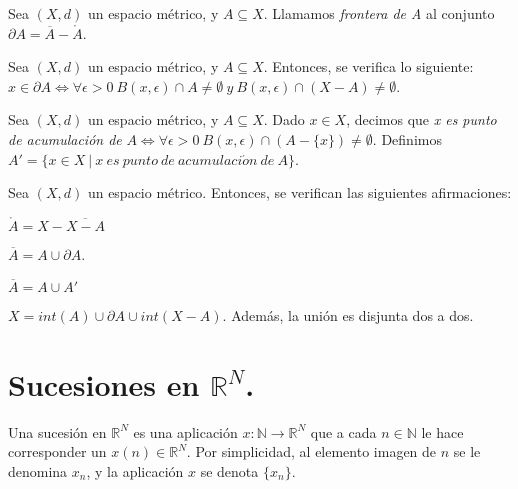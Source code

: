 \begin{ndef}[Frontera]
Sea $(X,d)$ un espacio métrico, y $A\subseteq X$. Llamamos \textit{frontera de A} al conjunto $\partial A = \overline{A}-\mathring{A}$.
\end{ndef}



\begin{nprop}
Sea $(X,d)$ un espacio métrico, y $A\subseteq X$. Entonces, se verifica lo siguiente:
$x\in \partial A \iff \forall \epsilon > 0\ B(x,\epsilon)\cap A \neq \emptyset \ y\ B(x,\epsilon)\cap (X-A) \neq \emptyset$.
\end{nprop}



\begin{ndef}
Sea $(X,d)$ un espacio métrico, y $A\subseteq X$. Dado $x\in X$, decimos que \textit{x es punto de acumulación de} $A \iff \forall \epsilon > 0\ B(x,\epsilon)\cap (A-\{x\})\neq \emptyset$. Definimos $A' = \{ x\in X \ | \ x\ es\ punto\ de\ acumulaci\acute{o}n\ de\ A \}$.
\end{ndef}



\begin{nprop}
Sea $(X,d)$ un espacio métrico. Entonces, se verifican las siguientes afirmaciones:

\begin{nlist}
\item $\mathring{A} = X - \overline{X-A}$

\item $\overline{A} = A \cup \partial A$.

\item $\overline{A} = A \cup A'$

\item $X = int(A) \cup \partial A \cup int(X-A)$. Además, la unión es disjunta dos a dos.
\end{nlist}

\end{nprop}

\newpage


\section{Sucesiones en $\mathbb{R}^N$.}



\begin{ndef}
Una sucesión en $\mathbb{R}^N$ es una aplicación $x: \mathbb{N} \longrightarrow \mathbb{R}^N$ que a cada $n\in \mathbb{N}$ le hace corresponder un $x(n) \in \mathbb{R}^N$. Por simplicidad, al elemento imagen de $n$ se le denomina $x_n$, y la aplicación $x$ se denota $\{x_n\}$.
\end{ndef}



